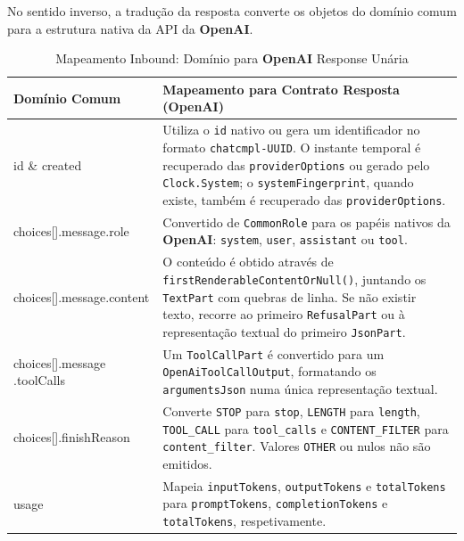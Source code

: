 No sentido inverso, a tradução da resposta converte os objetos do domínio comum para a estrutura nativa da API da \textbf{OpenAI}.

\begin{table}[H]
    \centering
    \footnotesize
    \renewcommand{\arraystretch}{1.25}
    \begin{tabularx}{\textwidth}{|>{\ttfamily\raggedright\arraybackslash}p{4cm}|Y|}
        \hline
        \textbf{Domínio Comum} & \textbf{Mapeamento para Contrato Resposta (OpenAI)} \\
        \hline
        id \& created &
        Utiliza o \texttt{id} nativo ou gera um identificador no formato \texttt{chatcmpl-UUID}. O instante temporal é recuperado das \texttt{providerOptions} ou gerado pelo \texttt{Clock.System}; o \texttt{systemFingerprint}, quando existe, também é recuperado das \texttt{providerOptions}. \\
        \hline
        choices[].message.role &
        Convertido de \texttt{CommonRole} para os papéis nativos da \textbf{OpenAI}: \texttt{system}, \texttt{user}, \texttt{assistant} ou \texttt{tool}. \\
        \hline
        choices[].message.content &
        O conteúdo é obtido através de \texttt{firstRenderableContentOrNull()}, juntando os \texttt{TextPart} com quebras de linha. Se não existir texto, recorre ao primeiro \texttt{RefusalPart} ou à representação textual do primeiro \texttt{JsonPart}. \\
        \hline
        choices[].message
        .toolCalls &
        Um \texttt{ToolCallPart} é convertido para um \texttt{OpenAiToolCallOutput}, formatando os \texttt{argumentsJson} numa única representação textual. \\
        \hline
        choices[].finishReason &
        Converte \texttt{STOP} para \texttt{stop}, \texttt{LENGTH} para \texttt{length}, \texttt{TOOL\_CALL} para \texttt{tool\_calls} e \texttt{CONTENT\_FILTER} para \texttt{content\_filter}. Valores \texttt{OTHER} ou nulos não são emitidos. \\
        \hline
        usage &
        Mapeia \texttt{inputTokens}, \texttt{outputTokens} e \texttt{totalTokens} para \texttt{promptTokens}, \texttt{completionTokens} e \texttt{totalTokens}, respetivamente. \\
        \hline
    \end{tabularx}
    \caption{Mapeamento Inbound: Domínio para \textbf{OpenAI} Response Unária}
\end{table}



